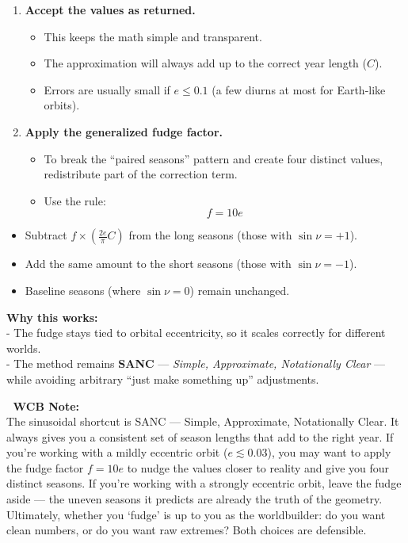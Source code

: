 \documentclass[
  letterpaper,
]{book}
\providecommand{\tightlist}{%
  \setlength{\itemsep}{0pt}\setlength{\parskip}{0pt}}
\begin{document}
\begin{enumerate}
\def\labelenumi{\arabic{enumi}.}
\tightlist
\item
  \textbf{Accept the values as returned.}

  \begin{itemize}
  \tightlist
  \item
    This keeps the math simple and transparent.\\
  \item
    The approximation will always add up to the correct year length
    (\(C\)).\\
  \item
    Errors are usually small if \(e \leq 0.1\) (a few diurns at most for
    Earth-like orbits).
  \end{itemize}
\item
  \textbf{Apply the generalized fudge factor.}

  \begin{itemize}
  \tightlist
  \item
    To break the ``paired seasons'' pattern and create four distinct
    values, redistribute part of the correction term.\\
  \item
    Use the rule: \[
    f = 10e
    \]
  \end{itemize}
\end{enumerate}

\begin{itemize}
\tightlist
\item
  Subtract \(f \times \left(\tfrac{2e}{\pi}C\right)\) from the long
  seasons (those with \(\sin\nu = +1\)).\\
\item
  Add the same amount to the short seasons (those with
  \(\sin\nu = -1\)).\\
\item
  Baseline seasons (where \(\sin\nu = 0\)) remain unchanged.
\end{itemize}

\textbf{Why this works:}\\
- The fudge stays tied to orbital eccentricity, so it scales correctly
for different worlds.\\
- The method remains \textbf{SANC} --- \emph{Simple, Approximate,
Notationally Clear} --- while avoiding arbitrary ``just make something
up'' adjustments.

📖 \textbf{WCB Note:}\\
The sinusoidal shortcut is SANC --- Simple, Approximate, Notationally
Clear. It always gives you a consistent set of season lengths that add
to the right year. If you're working with a mildly eccentric orbit
(\(e \lesssim 0.03\)), you may want to apply the fudge factor \(f=10e\)
to nudge the values closer to reality and give you four distinct
seasons. If you're working with a strongly eccentric orbit, leave the
fudge aside --- the uneven seasons it predicts are already the truth of
the geometry. Ultimately, whether you `fudge' is up to you as the
worldbuilder: do you want clean numbers, or do you want raw extremes?
Both choices are defensible.
\end{document}

